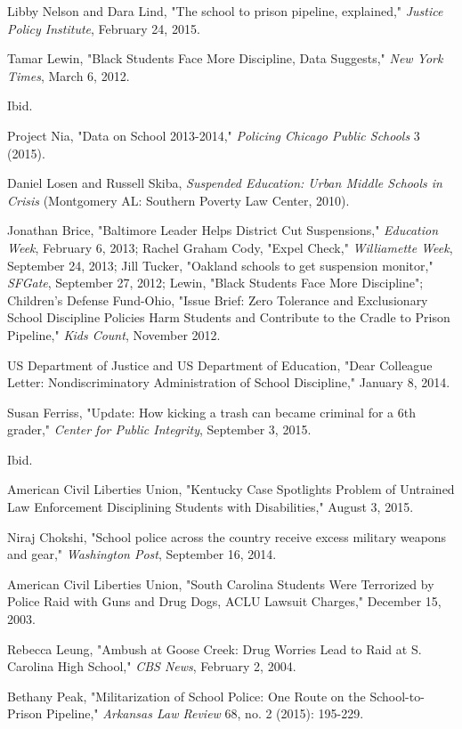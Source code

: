 \documentclass[fontset=fandol, a4paper, 12pt, openright]{ctexbook}
\begin{document}
\begin{enumerate}[label={[\arabic*]}]
    \item Libby Nelson and Dara Lind, "The school to prison pipeline, explained," \textit{Justice Policy Institute}, February 24, 2015.
    \item Tamar Lewin, "Black Students Face More Discipline, Data Suggests," \textit{New York Times}, March 6, 2012.
    \item Ibid.
    \item Project Nia, "Data on School 2013-2014," \textit{Policing Chicago Public Schools} 3 (2015).
    \item Daniel Losen and Russell Skiba, \textit{Suspended Education: Urban Middle Schools in Crisis} (Montgomery AL: Southern Poverty Law Center, 2010).
    \item Jonathan Brice, "Baltimore Leader Helps District Cut Suspensions," \textit{Education Week}, February 6, 2013; Rachel Graham Cody, "Expel Check," \textit{Williamette Week}, September 24, 2013; Jill Tucker, "Oakland schools to get suspension monitor," \textit{SFGate}, September 27, 2012; Lewin, "Black Students Face More Discipline"; Children's Defense Fund-Ohio, "Issue Brief: Zero Tolerance and Exclusionary School Discipline Policies Harm Students and Contribute to the Cradle to Prison Pipeline," \textit{Kids Count}, November 2012.
    \item US Department of Justice and US Department of Education, "Dear Colleague Letter: Nondiscriminatory Administration of School Discipline," January 8, 2014.
    \item Susan Ferriss, "Update: How kicking a trash can became criminal for a 6th grader," \textit{Center for Public Integrity}, September 3, 2015.
    \item Ibid.
    \item American Civil Liberties Union, "Kentucky Case Spotlights Problem of Untrained Law Enforcement Disciplining Students with Disabilities," August 3, 2015.
    \item Niraj Chokshi, "School police across the country receive excess military weapons and gear," \textit{Washington Post}, September 16, 2014.
    \item American Civil Liberties Union, "South Carolina Students Were Terrorized by Police Raid with Guns and Drug Dogs, ACLU Lawsuit Charges," December 15, 2003.
    \item Rebecca Leung, "Ambush at Goose Creek: Drug Worries Lead to Raid at S. Carolina High School," \textit{CBS News}, February 2, 2004.
    \item Bethany Peak, "Militarization of School Police: One Route on the School-to-Prison Pipeline," \textit{Arkansas Law Review} 68, no. 2 (2015): 195-229.

\end{enumerate}
\end{document}
